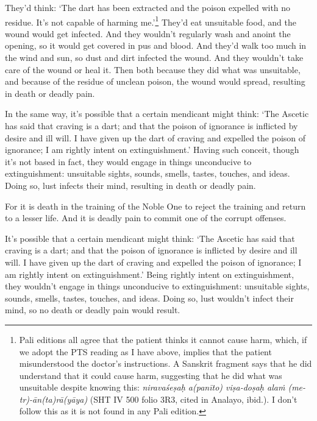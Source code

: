 \documentclass[12pt,openany]{book}%
\begin{document}
They’d think: ‘The dart has been extracted and the poison expelled with no residue. It’s not capable of harming me.’\footnote{Pali editions all agree that the patient thinks it cannot cause harm, which, if we adopt the PTS reading as I have above, implies that the patient misunderstood the doctor’s instructions. A Sanskrit fragment says that he did understand that it could cause harm, suggesting that he did what was unsuitable despite knowing this: \textit{\textsanskrit{niravaśeṣaḥ} a(\textsanskrit{panīto}) \textsanskrit{viṣa}-\textsanskrit{doṣaḥ} \textsanskrit{alaṁ} (me-tr)-\textsanskrit{ān}(ta)\textsanskrit{rā}(\textsanskrit{yāya})} (SHT IV 500 folio 3R3, cited in Analayo, ibid.). I don’t follow this as it is not found in any Pali edition. } They’d eat unsuitable food, and the wound would get infected. And they wouldn’t regularly wash and anoint the opening, so it would get covered in pus and blood. And they’d walk too much in the wind and sun, so dust and dirt infected the wound. And they wouldn’t take care of the wound or heal it. Then both because they did what was unsuitable, and because of the residue of unclean poison, the wound would spread, resulting in death or deadly pain. 

In the same way, it’s possible that a certain mendicant might think: ‘The Ascetic has said that craving is a dart; and that the poison of ignorance is inflicted by desire and ill will. I have given up the dart of craving and expelled the poison of ignorance; I am rightly intent on extinguishment.’ Having such conceit, though it’s not based in fact, they would engage in things unconducive to extinguishment: unsuitable sights, sounds, smells, tastes, touches, and ideas. Doing so, lust infects their mind, resulting in death or deadly pain. 

For it is death in the training of the Noble One to reject the training and return to a lesser life. And it is deadly pain to commit one of the corrupt offenses. 

It’s possible that a certain mendicant might think: ‘The Ascetic has said that craving is a dart; and that the poison of ignorance is inflicted by desire and ill will. I have given up the dart of craving and expelled the poison of ignorance; I am rightly intent on extinguishment.’ Being rightly intent on extinguishment, they wouldn’t engage in things unconducive to extinguishment: unsuitable sights, sounds, smells, tastes, touches, and ideas. Doing so, lust wouldn’t infect their mind, so no death or deadly pain would result. 
\end{document}
